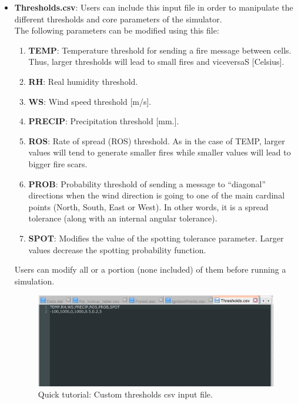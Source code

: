 \documentclass[11pt]{article}
\begin{document}
\begin{enumerate}
\begin{itemize}
		\item \textbf{Thresholds.csv}: Users can include this input file in order to manipulate the different thresholds and core parameters of the simulator.\\
				
		The following parameters can be modified using this file:
		\begin{enumerate}
			\item \textbf{TEMP}: Temperature threshold for sending a fire message between cells. Thus, larger thresholds will lead to small fires and viceversaS [Celsius].
			
			\item \textbf{RH}: Real humidity threshold.
			
			\item \textbf{WS}: Wind speed threshold [m/s].
			\item \textbf{PRECIP}: Precipitation threshold [mm.].
			\item \textbf{ROS}: Rate of spread (ROS) threshold. As in the case of TEMP, larger values will tend to generate smaller fires while smaller values will lead to bigger fire scars.
			\item \textbf{PROB}: Probability threshold of sending a message to ``diagonal'' directions when the wind direction is going to one of the main cardinal points (North, South, East or West). In other words, it is a spread tolerance (along with an internal angular tolerance).
			\item \textbf{SPOT}: Modifies the value of the spotting tolerance parameter. Larger values decrease the spotting probability function. 
		\end{enumerate}
		
Users can modify all or a portion (none included) of them before running a simulation.		
		
		\begin{figure}[h!]
\centering
\includegraphics[scale=0.6]{Tutorial8.png}
\caption{\label{fig:Tut8} Quick tutorial: Custom thresholds csv input file.}
\end{figure}
		

\end{itemize}
\end{enumerate}
\end{document}
